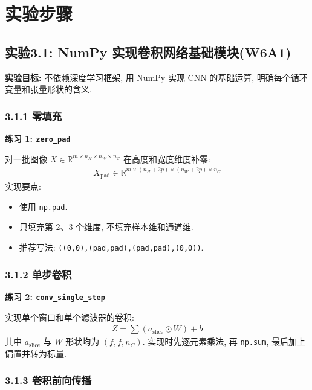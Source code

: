 \documentclass{../../nndlcourse}
\begin{document}
\section{实验步骤}

\subsection*{实验3.1: NumPy 实现卷积网络基础模块(W6A1)}

\textbf{实验目标: }不依赖深度学习框架, 用 NumPy 实现 CNN 的基础运算, 明确每个循环变量和张量形状的含义.

\subsubsection*{3.1.1 零填充}

\textbf{练习 1: \texttt{zero\_pad}}

对一批图像 $X\in\mathbb{R}^{m\times n_H\times n_W\times n_C}$ 在高度和宽度维度补零:
\begin{align}
    X_{\mathrm{pad}}\in\mathbb{R}^{m\times(n_H+2p)\times(n_W+2p)\times n_C}
\end{align}
实现要点:
\begin{itemize}
    \item 使用 \texttt{np.pad}.
    \item 只填充第 2、3 个维度, 不填充样本维和通道维.
    \item 推荐写法: \texttt{((0,0),(pad,pad),(pad,pad),(0,0))}.
\end{itemize}

\subsubsection*{3.1.2 单步卷积}

\textbf{练习 2: \texttt{conv\_single\_step}}

实现单个窗口和单个滤波器的卷积:
\begin{align}
    Z = \sum (a_{\mathrm{slice}}\odot W) + b
\end{align}
其中 $a_{\mathrm{slice}}$ 与 $W$ 形状均为 $(f,f,n_C)$. 实现时先逐元素乘法, 再 \texttt{np.sum}, 最后加上偏置并转为标量.

\subsubsection*{3.1.3 卷积前向传播}
\end{document}
